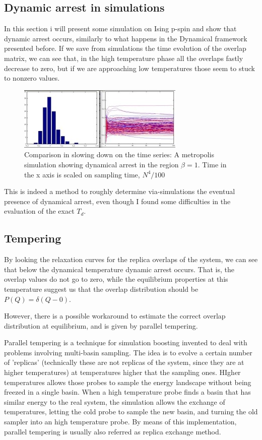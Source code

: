 \documentclass{article}
\begin{document}
\subsection{Dynamic arrest in simulations}

In this section i will present some simulation on Ising p-spin and show that
dynamic arrest occurs, similarly to what happens in the Dynamical framework
presented before. If we save from simulations the time evolution of the overlap matrix, we can see that, 
in the high temperature phase all the overlaps fastly decrease to zero, but if we are approaching low 
temperatures those seem to stuck to nonzero values.


\begin{figure}[h]
		\includegraphics{metro2.jpg}

\label{fig:img_e}
	\caption{Comparison in slowing down on the time series: A metropolis simulation showing dynamical arrest  in the region $\beta = 1$. 
	Time in the x axis is scaled on sampling time,  $N^4 / 100$}

\end{figure}

This is indeed a method to roughly determine via-simulations the eventual presence of dynamical arrest, even though I
found some difficulties in the evaluation of the exact $T_d$. 

\subsection{Tempering}

By looking the relaxation curves for the replica overlaps of the system, we can see that below the dynamical temperature dynamic arrest occurs. That is, the overlap values do not go to zero, while the equilibrium properties at this temperature suggest us that the overlap distribution should be $P(Q) = \delta(Q-0)$.


However, there is a possible workaround to estimate the correct overlap distribution at equilibrium, and is given by parallel tempering. 

Parallel tempering is a  technique for simulation boosting invented to deal with problems involving multi-basin sampling.
The idea is to evolve a certain number of 'replicas' (technically these are not replicas of the system, since they are at higher temperatures) at temperatures higher that the sampling ones.
HIgher temperatures allows those probes to sample the energy landscape without being freezed in a single basin.
When a high temperature probe finds a basin that has similar energy to the real system, the simulation allows the exchange of temperatures, letting the cold probe to sample the new basin, and turning the old sampler into an high temperature probe. By means of this implementation, parallel tempering is usually also referred as replica exchange method.
\end{document}

